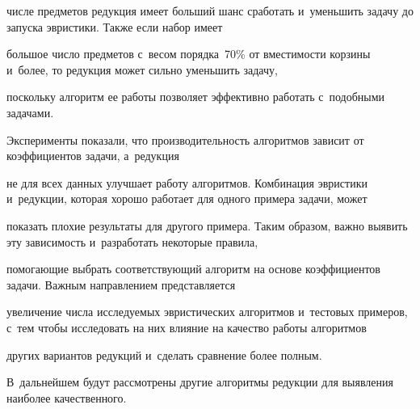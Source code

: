  чис\-ле предметов редукция имеет больший шанс сработать и~уменьшить задачу до запуска эвристики. Так\-же если набор имеет 

 большое чис\-ло предметов с~весом порядка~70\% от вместимости корзины и~более, то редукция может сильно уменьшить задачу, 

 по\-сколь\-ку алгоритм ее работы поз\-во\-ля\-ет эффективно работать с~по\-доб\-ны\-ми за\-да\-чами.



Эксперименты показали, что производительность алгоритмов зависит от коэффициентов задачи, а~редукция 

не для всех данных улучшает работу алгоритмов. Комбинация эвристики и~редукции, которая хорошо работает для одного примера задачи, может 

показать плохие результаты для другого примера. Таким образом, важ\-но выявить эту за\-ви\-си\-мость и~разработать некоторые правила, 

по\-мо\-га\-ющие вы\-брать со\-от\-вет\-ст\-ву\-ющий алгоритм на основе коэффициентов задачи. Важ\-ным на\-прав\-ле\-ни\-ем пред\-став\-ля\-ет\-ся 

увеличение чис\-ла ис\-сле\-ду\-емых эвристических алгоритмов и~тес\-то\-вых примеров, с~тем чтобы исследовать на них влияние на качество работы алгоритмов 

других вариантов редукций и~сделать срав\-не\-ние более полным. 

В~дальнейшем будут рас\-смот\-ре\-ны другие алгоритмы редукции для выявления наиболее ка\-чест\-вен\-ного.



